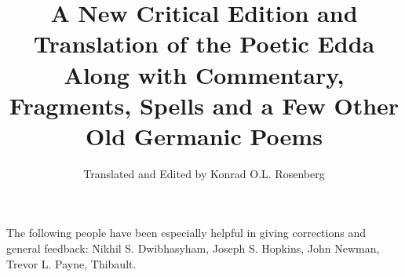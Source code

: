\title{%
  A New Critical Edition and Translation of the Poetic Edda \\
  \large Along with Commentary, Fragments, Spells and a Few Other Old Germanic Poems}

\author{Translated and Edited by Konrad O.L. Rosenberg}

\maketitle

\newpage

\begin{center} The following people have been especially helpful in giving corrections and general feedback: Nikhil S. Dwibhasyham, Joseph S. Hopkins, John Newman, Trevor L. Payne, Thibault.\end{center}

\newpage

\thispagestyle{empty}\tableofcontents

\newpage

